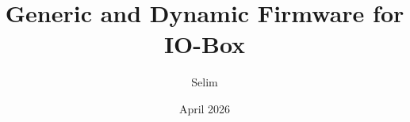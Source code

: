 \documentclass[12pt,a4paper]{report}
\begin{document}
\title{Generic and Dynamic Firmware for IO-Box}
\author{Selim}
\date{April 2026}
\maketitle

\tableofcontents
\clearpage





\end{document}
